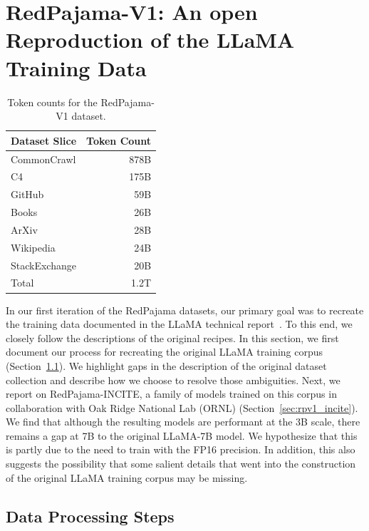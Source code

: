 \documentclass{article}
\begin{document}
\section{RedPajama-V1: An open Reproduction of the LLaMA Training Data}
\label{sec:rpv1}
\begin{table}
\vspace{-0.1em}
\centering
\small
\caption{Token counts for the RedPajama-V1 dataset.}
\label{tab:rpv1-token-counts}
\begin{tabular}{l r}
\toprule
Dataset Slice & Token Count \\
\midrule
CommonCrawl & 878B \\
C4 & 175B \\
GitHub & 59B \\
Books & 26B \\
ArXiv & 28B \\
Wikipedia & 24B \\
StackExchange & 20B\\
\midrule
Total & 1.2T\\
\bottomrule
\end{tabular}
\end{table}
In our first iteration of the RedPajama datasets, our primary goal was to recreate the training data documented in the LLaMA technical report~\cite{touvron2023allama}.
To this end, we closely follow the descriptions of the original recipes.
In this section, we first document our process for recreating the original LLaMA training corpus (Section~\ref{sec:rpv1_data}).
We highlight gaps in the description of the original dataset collection and describe how we choose to resolve those ambiguities.
Next, we report on RedPajama-INCITE, a family of models trained on this corpus in collaboration with Oak Ridge National Lab (ORNL) (Section~\ref{sec:rpv1_incite}).
We find that although the resulting models are performant at the 3B scale, there remains a gap at 7B to the original LLaMA-7B model. We hypothesize that this is partly due to the need to train with the FP16 precision. In addition, this also suggests the possibility that some salient details that went into the construction of the original LLaMA training corpus may be missing.


\subsection{Data Processing Steps}
\label{sec:rpv1_data}
\end{document}
